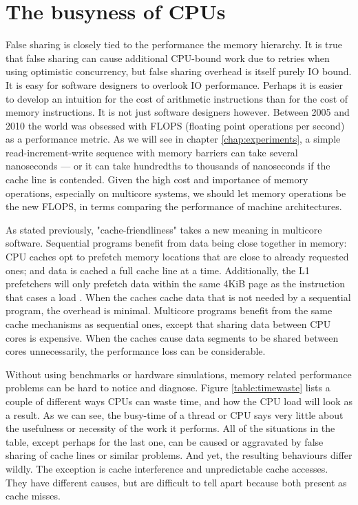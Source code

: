 \chapter{The busyness of CPUs}
\label{chap:busyness}

False sharing is closely tied to the performance the memory hierarchy.
It is true that false sharing can cause additional CPU-bound work due to retries
when using optimistic concurrency, but false sharing overhead is itself purely
IO bound. It is easy for software designers to overlook IO performance. Perhaps
it is easier to develop an intuition for the cost of arithmetic instructions
than for the cost of memory instructions. It is not just software designers
however. Between 2005 and 2010 the world was obsessed with FLOPS (floating point
operations per second) as a performance metric. As we will see in chapter
\ref{chap:experiments}, a simple read-increment-write sequence with memory
barriers can take several nanoseconds --- or it can take hundredths to thousands
of nanoseconds if the cache line is contended. Given the high cost and
importance of memory operations, especially on multicore systems, we should let
memory operations be the new FLOPS, in terms comparing the performance of
machine architectures.

As stated previously, "cache-friendliness" takes a new meaning in multicore
software. Sequential programs benefit from data being close together in memory:
CPU caches opt to prefetch memory locations that are close to already requested
ones; and data is cached a full cache line at a time. Additionally, the L1
prefetchers will only prefetch data within the same 4KiB page as the instruction
that cases a load \cite{inteloptimize}. When the caches cache data that is not
needed by a sequential program, the overhead is minimal. Multicore programs
benefit from the same cache mechanisms as sequential ones, except that sharing
data between CPU cores is expensive. When the caches cause data segments to be
shared between cores unnecessarily, the performance loss can be considerable.

Without using benchmarks or hardware simulations, memory related performance
problems can be hard to notice and diagnose. Figure \ref{table:timewaste} lists
a couple of different ways CPUs can waste time, and how the CPU load will look as a
result. As we can see, the busy-time of a thread or CPU says very little about
the usefulness or necessity of the work it performs. All of the situations in
the table, except perhaps for the last one, can be caused or aggravated by false
sharing of cache lines or similar problems. And yet, the resulting behaviours
differ wildly. The exception is cache interference and unpredictable cache
accesses. They have different causes, but are difficult to tell apart because
both present as cache misses.

